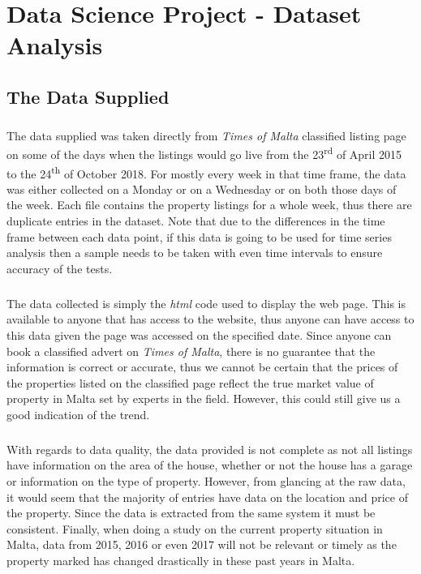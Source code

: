 \chapter{Data Science Project - Dataset Analysis}

\section{The Data Supplied}
\paragraph{ }The data supplied was taken directly from \textit{Times of Malta} classified listing page on some of the days when the listings would go live from the 23\textsuperscript{rd} of April 2015 to the 24\textsuperscript{th} of October 2018. For mostly every week in that time frame, the data was either collected on a Monday or on a Wednesday or on both those days of the week. Each file contains the property listings for a whole week, thus there are duplicate entries in the dataset. Note that due to the differences in the time frame between each data point, if this data is going to be used for time series analysis then a sample needs to be taken with even time intervals to ensure accuracy of the tests.

\paragraph{ }The data collected is simply the \textit{html} code used to display the web page. This is available to anyone that has access to the website, thus anyone can have access to this data given the page was accessed on the specified date. Since anyone can book a classified advert on \textit{Times of Malta}, there is no guarantee that the information is correct or accurate, thus we cannot be certain that the prices of the properties listed on the classified page reflect the true market value of property in Malta set by experts in the field. However, this could still give us a good indication of the trend. 

\paragraph{ }With regards to data quality, the data provided is not complete as not all listings have information on the area of the house, whether or not the house has a garage or information on the type of property. However, from glancing at the raw data, it would seem that the majority of entries have data on the location and price of the property. Since the data is extracted from the same system it must be consistent. Finally, when doing a study on the current property situation in Malta, data from 2015, 2016 or even 2017 will not be relevant or timely as the property marked has changed drastically in these past years in Malta. 

